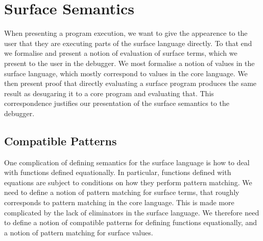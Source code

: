 \section{Surface Semantics}
\label{sec:surfacesemantics}
When presenting a program execution, we want to give the appearence to the user that they are executing parts
of the surface language directly. To that end we formalise and present a notion of evaluation of surface
terms, which we present to the user in the debugger. We most formalise a notion of values in the surface
language, which mostly correspond to values in the core language. We then present proof that directly
evaluating a surface program produces the same result as desugaring it to a core program and evaluating that.
This correspondence justifies our presentation of the surface semantics to the debugger.

\subsection{Compatible Patterns}
One complication of defining semantics for the surface language is how to deal with functions defined
equationally. In particular, functions defined with equations are subject to conditions on how they perform
pattern matching. We need to define a notion of pattern matching for surface terms, that roughly corresponds
to pattern matching in the core language. This is made more complicated by the lack of eliminators in the
surface language. We therefore need to define a notion of compatible patterns for defining functions
equationally, and a notion of pattern matching for surface values.


